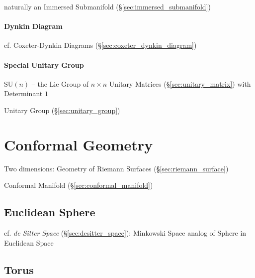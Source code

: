 naturally an Immersed Submanifold (\S\ref{sec:immersed_submanifold})



\paragraph{Dynkin Diagram}\label{sec:dynkin_diagram}\hfill

cf. Coxeter-Dynkin Diagrams (\S\ref{sec:coxeter_dynkin_diagram})



\paragraph{Special Unitary Group}\label{sec:special_unitary}\hfill

$\mathrm{SU}(n)$ -- the Lie Group of $n \times n$ Unitary Matrices
(\S\ref{sec:unitary_matrix}) with Determinant $1$

Unitary Group (\S\ref{sec:unitary_group})



\section{Conformal Geometry}\label{sec:conformal_geometry}

Two dimensions: Geometry of Riemann Surfaces
(\S\ref{sec:riemann_surface})

\fist Conformal Manifold (\S\ref{sec:conformal_manifold})



\subsection{Euclidean Sphere}\label{sec:euclidean_sphere}

cf. \emph{de Sitter Space} (\S\ref{sec:desitter_space}): Minkowski Space analog
of Sphere in Euclidean Space



\subsection{Torus}\label{sec:torus}

